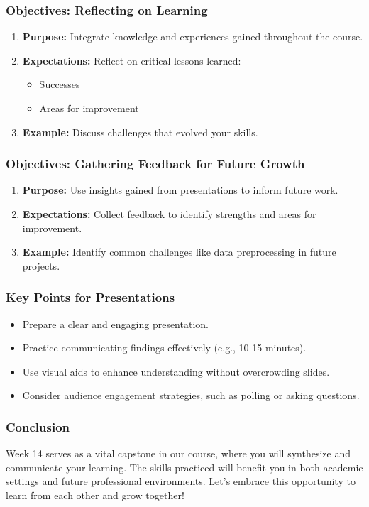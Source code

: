 \documentclass[aspectratio=169]{beamer}
\begin{document}
\begin{frame}[fragile]
    \frametitle{Objectives: Reflecting on Learning}
    \begin{enumerate}
        \item \textbf{Purpose:} Integrate knowledge and experiences gained throughout the course.
        \item \textbf{Expectations:} Reflect on critical lessons learned:
        \begin{itemize}
            \item Successes
            \item Areas for improvement
        \end{itemize}
        \item \textbf{Example:} Discuss challenges that evolved your skills.
    \end{enumerate}
\end{frame}

\begin{frame}[fragile]
    \frametitle{Objectives: Gathering Feedback for Future Growth}
    \begin{enumerate}
        \item \textbf{Purpose:} Use insights gained from presentations to inform future work.
        \item \textbf{Expectations:} Collect feedback to identify strengths and areas for improvement.
        \item \textbf{Example:} Identify common challenges like data preprocessing in future projects.
    \end{enumerate}
\end{frame}

\begin{frame}[fragile]
    \frametitle{Key Points for Presentations}
    \begin{itemize}
        \item Prepare a clear and engaging presentation.
        \item Practice communicating findings effectively (e.g., 10-15 minutes).
        \item Use visual aids to enhance understanding without overcrowding slides.
        \item Consider audience engagement strategies, such as polling or asking questions.
    \end{itemize}
\end{frame}

\begin{frame}[fragile]
    \frametitle{Conclusion}
    Week 14 serves as a vital capstone in our course, where you will synthesize and communicate your learning. The skills practiced will benefit you in both academic settings and future professional environments. Let's embrace this opportunity to learn from each other and grow together!
\end{frame}
\end{document}
